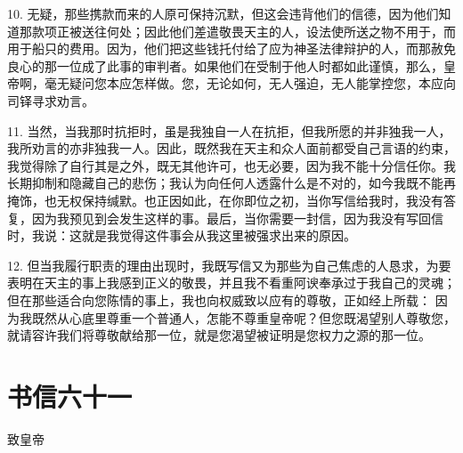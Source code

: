 10. 无疑，那些携款而来的人原可保持沉默，但这会违背他们的信德，因为他们知道那款项正被送往何处；因此他们差遣敬畏天主的人，设法使所送之物不用于，而用于船只的费用。因为，他们把这些钱托付给了应为神圣法律辩护的人，而那赦免良心的那一位成了此事的审判者。如果他们在受制于他人时都如此谨慎，那么，皇帝啊，毫无疑问您本应怎样做。您，无论如何，无人强迫，无人能掌控您，本应向司铎寻求劝言。\par

11. 当然，当我那时抗拒时，虽是我独自一人在抗拒，但我所愿的并非独我一人，我所劝言的亦非独我一人。因此，既然我在天主和众人面前都受自己言语的约束，我觉得除了自行其是之外，既无其他许可，也无必要，因为我不能十分信任你。我长期抑制和隐藏自己的悲伤；我认为向任何人透露什么是不对的，如今我既不能再掩饰，也无权保持缄默。也正因如此，在你即位之初，当你写信给我时，我没有答复，因为我预见到会发生这样的事。最后，当你需要一封信，因为我没有写回信时，我说：这就是我觉得这件事会从我这里被强求出来的原因。\par

12. 但当我履行职责的理由出现时，我既写信又为那些为自己焦虑的人恳求，为要表明在天主的事上我感到正义的敬畏，并且我不看重阿谀奉承过于我自己的灵魂；但在那些适合向您陈情的事上，我也向权威致以应有的尊敬，正如经上所载： 因为我既然从心底里尊重一个普通人，怎能不尊重皇帝呢？但您既渴望别人尊敬您，就请容许我们将尊敬献给那一位，就是您渴望被证明是您权力之源的那一位。\par



\section{书信六十一}

\par

致皇帝\par

